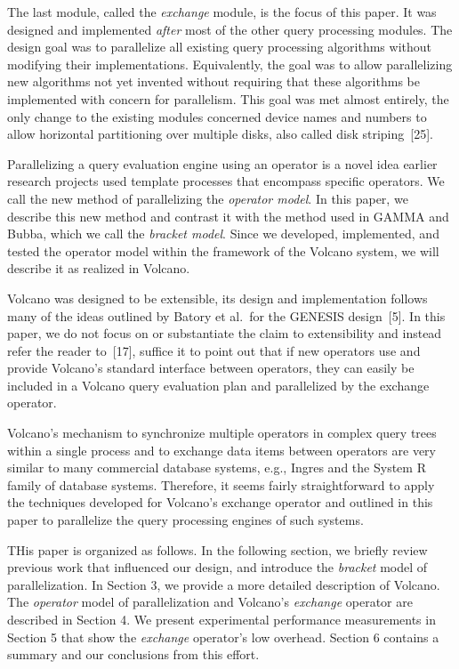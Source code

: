 \documentclass[a4paper,11pt,notitlepage,twoside,openright]{article}
\begin{document}
The last module, called the \emph{exchange} module, is the
focus of this paper. It was designed and implemented \emph{after}
most of the other query processing modules. The design
goal was to parallelize all existing query processing algorithms
without modifying their implementations.
Equivalently, the goal was to allow parallelizing new algorithms
not yet invented without requiring that these algorithms
be implemented with concern for parallelism. This
goal was met almost entirely, the only change to the existing
modules concerned device names and numbers to allow
horizontal partitioning over multiple disks, also called disk
striping~{[25]}.

Parallelizing a query evaluation engine using an
operator is a novel idea earlier research projects used
template processes that encompass specific operators. We
call the new method of parallelizing the \emph{operator model}. In
this paper, we describe this new method and contrast it
with the method used in GAMMA and Bubba, which we
call the \emph{bracket model}. Since we developed, implemented,
and tested the operator model within the framework of the
Volcano system, we will describe it as realized in Volcano.

Volcano was designed to be extensible, its design and
implementation follows many of the ideas outlined by
Batory et al.\ for the GENESIS design~{[5]}. In this paper,
we do not focus on or substantiate the claim to extensibility
and instead refer the reader to~{[17]}, suffice it to point out
that if new operators use and provide Volcano's standard
interface between operators, they can easily be included in a
Volcano query evaluation plan and parallelized by the
exchange operator.

Volcano's mechanism to synchronize multiple operators
in complex query trees within a single process and to
exchange data items between operators are very similar to
many commercial database systems, e.g., Ingres and the
System R family of database systems. Therefore, it seems
fairly straightforward to apply the techniques developed for
Volcano's exchange operator and outlined in this paper to
parallelize the query processing engines of such systems.

THis paper is organized as follows. In the following
section, we briefly review previous work that influenced our
design, and introduce the \emph{bracket} model of parallelization.
In Section 3, we provide a more detailed description of
Volcano. The \emph{operator} model of parallelization and
Volcano's \emph{exchange} operator are described in Section 4.
We present experimental performance measurements in Section 5
that show the \emph{exchange} operator's low overhead.
Section 6 contains a summary and our conclusions from this effort.
\end{document}
